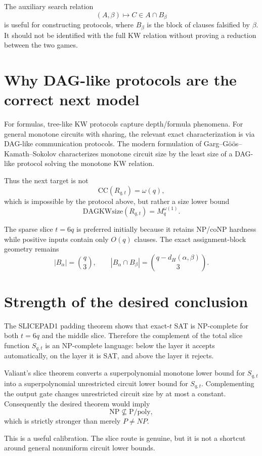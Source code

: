 \documentclass[11pt]{article}
\begin{document}
The auxiliary search relation
\[
(A,\beta)\longmapsto
C\in A\cap B_\beta
\]
is useful for constructing protocols, where \(B_\beta\) is the block of clauses falsified by \(\beta\).
It should not be identified with the full KW relation without proving a reduction between the two games.

\section{Why DAG-like protocols are the correct next model}

For formulas, tree-like KW protocols capture depth/formula phenomena.  For general monotone
circuits with sharing, the relevant exact characterization is via DAG-like communication protocols.
The modern formulation of Garg--G\"o\"os--Kamath--Sokolov characterizes monotone circuit size by the least size of a DAG-like protocol solving the monotone KW relation.

Thus the next target is not
\[
\mathrm{CC}(R_{q,t})=\omega(q),
\]
which is impossible by the protocol above, but rather a size lower bound
\[
\mathrm{DAGKWsize}(R_{q,t})=M_q^{\omega(1)}.
\]

The sparse slice \(t=6q\) is preferred initially because it retains NP/coNP hardness while positive
inputs contain only \(O(q)\) clauses.  The exact assignment-block geometry remains
\[
|B_\alpha|=\binom q3,\qquad
|B_\alpha\cap B_\beta|
=
\binom{q-d_H(\alpha,\beta)}3.
\]

\section{Strength of the desired conclusion}

The SLICEPAD1 padding theorem shows that exact-\(t\) SAT is NP-complete for both \(t=6q\) and the middle slice.  Therefore the complement of the total slice function \(S_{q,t}\) is an NP-complete language: below the layer it accepts automatically, on the layer it is SAT, and above the layer it rejects.

Valiant's slice theorem converts a superpolynomial monotone lower bound for \(S_{q,t}\) into a
superpolynomial unrestricted circuit lower bound for \(S_{q,t}\).  Complementing the output gate
changes unrestricted circuit size by at most a constant.  Consequently the desired theorem would imply
\[
\mathrm{NP}\not\subseteq\mathrm{P/poly},
\]
which is strictly stronger than merely \(P\ne NP\).

This is a useful calibration.  The slice route is genuine, but it is not a shortcut around general
nonuniform circuit lower bounds.
\end{document}
